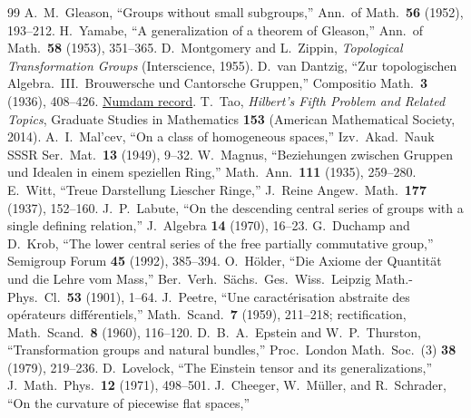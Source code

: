 \documentclass[12pt,openany]{book}
\numberwithin{equation}{section}
\theoremstyle{plain}
\theoremstyle{definition}
\theoremstyle{remark}
\begin{document}
\begin{thebibliography}{99}
	A.~M.~Gleason,
	``Groups without small subgroups,''
	Ann.\ of Math.\ \textbf{56} (1952), 193--212.
	H.~Yamabe,
	``A generalization of a theorem of Gleason,''
	Ann.\ of Math.\ \textbf{58} (1953), 351--365.
	D.~Montgomery and L.~Zippin,
	\emph{Topological Transformation Groups}
	(Interscience, 1955).
	D.~van Dantzig,
	``Zur topologischen Algebra.\ III.\ Brouwersche und Cantorsche
	Gruppen,''
	Compositio Math.\ \textbf{3} (1936), 408--426.
	\href{https://www.numdam.org/item/CM_1936__3__408_0/}
	{Numdam record}.
	T.~Tao,
	\emph{Hilbert's Fifth Problem and Related Topics},
	Graduate Studies in Mathematics \textbf{153}
	(American Mathematical Society, 2014).
	A.~I.~Mal'cev,
	``On a class of homogeneous spaces,''
	Izv.\ Akad.\ Nauk SSSR Ser.\ Mat.\ \textbf{13} (1949), 9--32.
	W.~Magnus,
	``Beziehungen zwischen Gruppen und Idealen in einem speziellen
	Ring,''
	Math.\ Ann.\ \textbf{111} (1935), 259--280.
	E.~Witt,
	``Treue Darstellung Liescher Ringe,''
	J.\ Reine Angew.\ Math.\ \textbf{177} (1937), 152--160.
	J.~P.~Labute,
	``On the descending central series of groups with a single defining
	relation,''
	J.\ Algebra \textbf{14} (1970), 16--23.
	G.~Duchamp and D.~Krob,
	``The lower central series of the free partially commutative
	group,''
	Semigroup Forum \textbf{45} (1992), 385--394.
	O.~H\"older,
	``Die Axiome der Quantit\"at und die Lehre vom Mass,''
	Ber.\ Verh.\ S\"achs.\ Ges.\ Wiss.\ Leipzig Math.-Phys.\ Cl.\
	\textbf{53} (1901), 1--64.
	J.~Peetre,
	``Une caract\'erisation abstraite des op\'erateurs
	diff\'erentiels,''
	Math.\ Scand.\ \textbf{7} (1959), 211--218;
	rectification, Math.\ Scand.\ \textbf{8} (1960), 116--120.
	D.~B.~A.~Epstein and W.~P.~Thurston,
	``Transformation groups and natural bundles,''
	Proc.\ London Math.\ Soc.\ (3) \textbf{38} (1979), 219--236.
	D.~Lovelock,
	``The Einstein tensor and its generalizations,''
	J.\ Math.\ Phys.\ \textbf{12} (1971), 498--501.
	J.~Cheeger, W.~M\"uller, and R.~Schrader,
	``On the curvature of piecewise flat spaces,''

\end{thebibliography}
\end{document}
